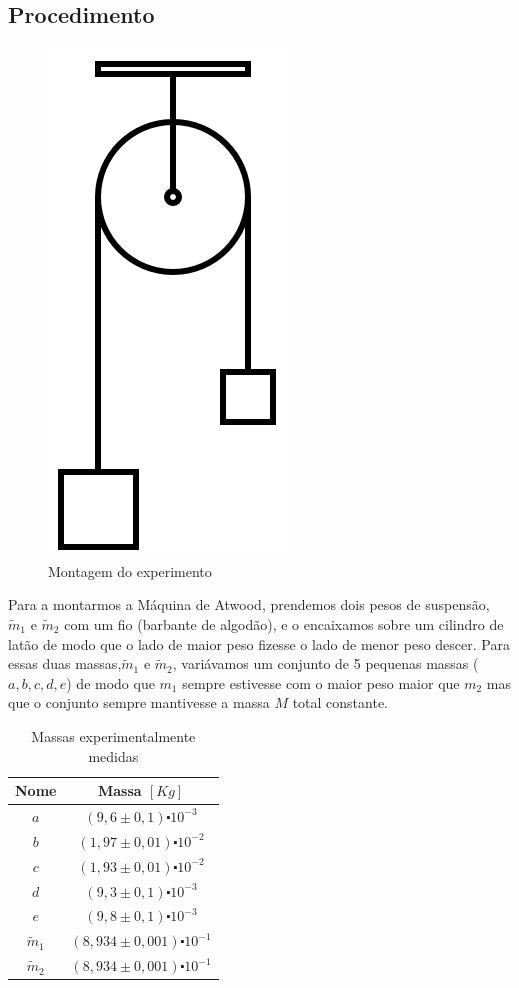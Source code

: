 \documentclass[a4paper]{article}
\providecommand{\tabularnewline}{\\} %
\begin{document}
\subsection{Procedimento}
\begin{figure}[!ht]
	\centering
	\includegraphics[scale=0.25]{Atwood_machine.jpg}
	\caption{Montagem do experimento}
\end{figure}

Para a montarmos a Máquina de Atwood, prendemos dois pesos de suspensão, $\widetilde{m}_{1}$ e $\widetilde{m}_{2}$ com um fio (barbante de algodão), e o encaixamos sobre um cilindro de latão de modo que o lado de maior peso fizesse o lado de menor peso descer. Para essas duas massas,$\widetilde{m}_{1}$ e $\widetilde{m}_{2}$, variávamos um conjunto de 5 pequenas massas ($a , b ,  c ,  d , e$) de modo que $m_1$ sempre estivesse com o maior peso maior que $m_2$ mas que o conjunto sempre mantivesse a massa $M$ total constante.

\begin{table}[!ht]
	\begin{centering}
	\caption{Massas experimentalmente medidas}
	\par\end{centering}
	\centering{}%
	\begin{tabular}{|c|c|}
	\hline 
	Nome & Massa $[Kg]$\tabularnewline		\hline 
	$a$ & $(9,6\pm0,1)\centerdot10^{-3}$\tabularnewline		\hline 
	$b$ & $(1,97\pm0,01)\centerdot10^{-2}$\tabularnewline	\hline 
	$c$ & $(1,93\pm0,01)\centerdot10^{-2}$\tabularnewline	\hline 
	$d$ & $(9,3\pm0,1)\centerdot10^{-3}$\tabularnewline \hline 
	$e$ & $(9,8\pm0,1)\centerdot10^{-3}$\tabularnewline	\hline 
	$\widetilde{m}_{1}$ & $(8,934\pm0,001)\centerdot10^{-1}$\tabularnewline 	\hline 
	$\widetilde{m}_{2}$ & $(8,934\pm0,001)\centerdot10^{-1}$\tabularnewline 	\hline 
	\end{tabular}
\end{table}
\end{document}
